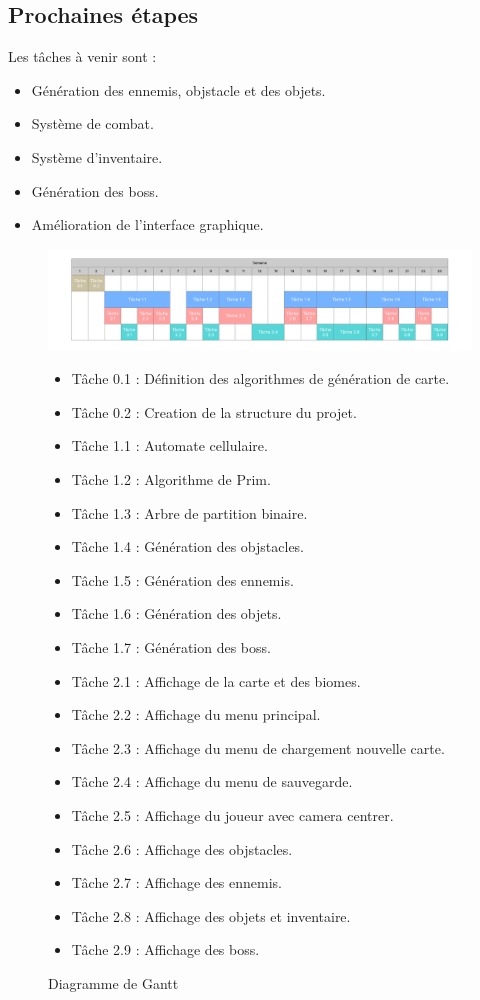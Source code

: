 \documentclass{article}
\begin{document}
\subsection{Prochaines étapes}
Les tâches à venir sont :
\begin{itemize}
    \item Génération des ennemis, objstacle et des objets.
    \item Système de combat.
    \item Système d’inventaire.
    \item Génération des boss.
    \item Amélioration de l’interface graphique.
\end{itemize}
\begin{figure}
  \centering
  \includegraphics[width=1\textwidth]{Diagramme_de_Gantt.png}
  \caption{Diagramme de Gantt}
  \vspace{1cm}
  \begin{itemize}
    
    \item Tâche 0.1 : Définition des algorithmes de génération de carte.
    \item Tâche 0.2 : Creation de la structure du projet.

    \item Tâche 1.1 : Automate cellulaire.
    \item Tâche 1.2 : Algorithme de Prim.
    \item Tâche 1.3 : Arbre de partition binaire.
    \item Tâche 1.4 : Génération des objstacles.
    \item Tâche 1.5 : Génération des ennemis.
    \item Tâche 1.6 : Génération des objets.
    \item Tâche 1.7 : Génération des boss.

    \item Tâche 2.1 : Affichage de la carte et des biomes.
    \item Tâche 2.2 : Affichage du menu principal.
    \item Tâche 2.3 : Affichage du menu de chargement nouvelle carte.
    \item Tâche 2.4 : Affichage du menu de sauvegarde.
    \item Tâche 2.5 : Affichage du joueur avec camera centrer.
    \item Tâche 2.6 : Affichage des objstacles.
    \item Tâche 2.7 : Affichage des ennemis.
    \item Tâche 2.8 : Affichage des objets et inventaire.
    \item Tâche 2.9 : Affichage des boss.


\end{itemize}
\end{figure}
\end{document}
